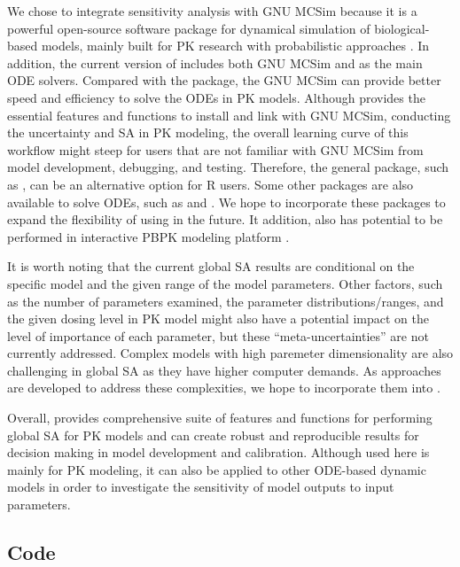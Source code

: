 We chose to integrate sensitivity analysis with GNU MCSim because it is
a powerful open-source software package for dynamical simulation of
biological-based models, mainly built for PK research with probabilistic
approaches \citep{bois2009gnu}. In addition, the current version of
 includes both GNU MCSim and  as the
main ODE solvers. Compared with the  package, the GNU
MCSim can provide better speed and efficiency to solve the ODEs in PK
models. Although  provides the essential features and
functions to install and link with GNU MCSim, conducting the uncertainty
and SA in PK modeling, the overall learning curve of this workflow might
steep for users that are not familiar with GNU MCSim from model
development, debugging, and testing. Therefore, the general package,
such as , can be an alternative option for R users.
Some other packages are also available to solve ODEs, such as
 \citep{wang2016tutorial} and 
\citep{R-mrgsolve}. We hope to incorporate these packages to expand the
flexibility of using  in the future. It addition,
 also has potential to be performed in interactive PBPK
modeling platform \citep{li2019integration}.

It is worth noting that the current global SA results are conditional on
the specific model and the given range of the model parameters. Other
factors, such as the number of parameters examined, the parameter
distributions/ranges, and the given dosing level in PK model might also
have a potential impact on the level of importance of each parameter,
but these ``meta-uncertainties'' are not currently addressed. Complex
models with high paremeter dimensionality are also challenging in global
SA as they have higher computer demands. As approaches are developed to
address these complexities, we hope to incorporate them into
.

Overall,  provides comprehensive suite of features and
functions for performing global SA for PK models and can create robust
and reproducible results for decision making in model development and
calibration. Although  used here is mainly for PK
modeling, it can also be applied to other ODE-based dynamic models in
order to investigate the sensitivity of model outputs to input
parameters.

\hypertarget{code}{%
\subsection{Code}\label{code}}

